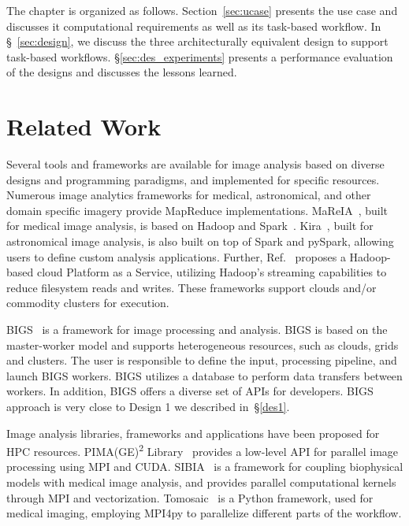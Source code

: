 The chapter is organized as follows. Section~\ref{sec:ucase} presents the use 
case and discusses it computational requirements as well as its task-based 
workflow. In \S~\ref{sec:design}, we discuss the three architecturally 
equivalent design to support task-based workflows. \S\ref{sec:des_experiments} 
presents a performance evaluation of the designs and discusses the lessons 
learned.
 
\section{Related Work}
Several tools and frameworks are available for image analysis based on diverse 
designs and programming paradigms, and implemented for specific resources.
Numerous image analytics frameworks for medical, astronomical, and other 
domain specific imagery provide MapReduce implementations.
MaReIA~\cite{vo2018mareia}, built for medical image analysis, is based on 
Hadoop and Spark~\cite{zaharia2010spark}. Kira~\cite{zhang2016kira}, built for 
astronomical image analysis, is also built on top of Spark and pySpark, 
allowing users to define custom analysis applications. Further, 
Ref.~\cite{yan2014large} proposes a Hadoop-based cloud Platform as a Service, 
utilizing Hadoop's streaming capabilities to reduce filesystem reads and 
writes. These frameworks support clouds and/or commodity clusters for 
execution.
 
BIGS~\cite{ramos2012bigs} is a framework for image processing and analysis.
BIGS is based on the master-worker model and supports heterogeneous resources, 
such as clouds, grids and clusters. The user is responsible to define the 
input, processing pipeline, and launch BIGS workers. BIGS utilizes a database 
to perform data transfers between workers. In addition, BIGS offers a diverse 
set of APIs for developers. BIGS approach is very close to Design 1 we 
described in~\S\ref{des1}.

Image analysis libraries, frameworks and applications have been proposed for 
HPC resources. PIMA(GE)\textsuperscript{2} Library~\cite{galizia2015mpicuda} 
provides a low-level API for parallel image processing using MPI and CUDA.
SIBIA~\cite{gholami2017framework} is a framework for coupling biophysical 
models with medical image analysis, and provides parallel computational 
kernels through MPI and vectorization. Tomosaic~\cite{vescovi2018tomosaic} is 
a Python framework, used for medical imaging, employing MPI4py to parallelize 
different parts of the workflow.
 
